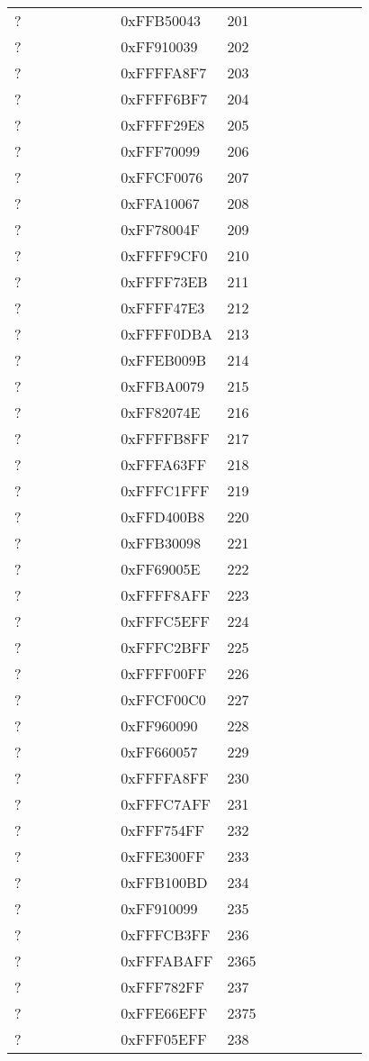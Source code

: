 \begin{longtable}{p{0.3\linewidth} p{0.3\linewidth} p{0.4\linewidth}}
? &  0xFFB50043 &  201\\
? &  0xFF910039 &  202\\
? &  0xFFFFA8F7 &  203\\
? &  0xFFFF6BF7 &  204\\
? &  0xFFFF29E8 &  205\\
? &  0xFFF70099 &  206\\
? &  0xFFCF0076 &  207\\
? &  0xFFA10067 &  208\\
? &  0xFF78004F &  209\\
? &  0xFFFF9CF0 &  210\\
? &  0xFFFF73EB &  211\\
? &  0xFFFF47E3 &  212\\
? &  0xFFFF0DBA &  213\\
? &  0xFFEB009B &  214\\
? &  0xFFBA0079 &  215\\
? &  0xFF82074E &  216\\
? &  0xFFFFB8FF &  217\\
? &  0xFFFA63FF &  218\\
? &  0xFFFC1FFF &  219\\
? &  0xFFD400B8 &  220\\
? &  0xFFB30098 &  221\\
? &  0xFF69005E &  222\\
? &  0xFFFF8AFF &  223\\
? &  0xFFFC5EFF &  224\\
? &  0xFFFC2BFF &  225\\
? &  0xFFFF00FF &  226\\
? &  0xFFCF00C0 &  227\\
? &  0xFF960090 &  228\\
? &  0xFF660057 &  229\\
? &  0xFFFFA8FF &  230\\
? &  0xFFFC7AFF &  231\\
? &  0xFFF754FF &  232\\
? &  0xFFE300FF &  233\\
? &  0xFFB100BD &  234\\
? &  0xFF910099 &  235\\
? &  0xFFFCB3FF &  236\\
? &  0xFFFABAFF &  2365\\
? &  0xFFF782FF &  237\\
? &  0xFFE66EFF &  2375\\
? &  0xFFF05EFF &  238\\

\end{longtable}
